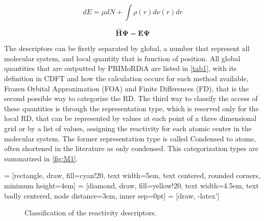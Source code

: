 \documentclass[a4paper,11pt]{refart}
\begin{document}
\begin{equation}
dE = \mu dN + \int \rho(r) d \nu (r) dr
\label{eq.1}
\end{equation}

\begin{equation}
\mathbf{\hat{H}\Psi= E\Psi}
\label{eq.1000}
\end{equation}


The descriptors can be firstly separated by global, a number that represent all molecular system, and local quantity that is function of position. All global quantities that are outputted by PRIMoRDiA are listed in \autoref{tab1}, with its definition in CDFT and how the calculation occurs for each method available, Frozen Orbital Approximation (FOA) and Finite Differences (FD), that is the second possible way to categorize the RD. The third way to classify the access of these quantities is through the representation type, which is reserved only for the local RD, that can be represented by values at each point of a three dimensional grid or by a list of values, assigning the reactivity for each atomic center in the molecular system. The former representation type is called Condensed to atoms, often shortened in the literature as only condensed. This categorization types are summarized in \autoref{fig:M1}.

 = [rectangle, draw, fill=cyan!20, 
text width=5em, text centered, rounded corners, minimum height=4em]
 = [diamond, draw, fill=yellow!20, 
text width=4.5em, text badly centered, node distance=3cm, inner sep=0pt]
 = [draw, -latex']

\begin{figure}[H]
	\centering
{}
\caption{Classification of the reactivity descriptors.} \label{fig:M1}
\end{figure}
\end{document}
